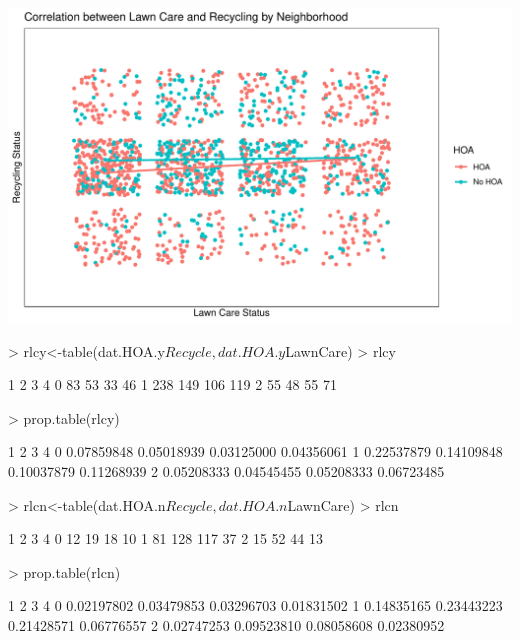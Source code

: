 \documentclass{article}
\begin{document}
\includegraphics{exam1-012}
\newline
\begin{Schunk}
\begin{Sinput}
> rlcy<-table(dat.HOA.y$Recycle,dat.HOA.y$LawnCare)
> rlcy
\end{Sinput}
\begin{Soutput}
      1   2   3   4
  0  83  53  33  46
  1 238 149 106 119
  2  55  48  55  71
\end{Soutput}
\begin{Sinput}
> prop.table(rlcy)
\end{Sinput}
\begin{Soutput}
             1          2          3          4
  0 0.07859848 0.05018939 0.03125000 0.04356061
  1 0.22537879 0.14109848 0.10037879 0.11268939
  2 0.05208333 0.04545455 0.05208333 0.06723485
\end{Soutput}
\begin{Sinput}
> rlcn<-table(dat.HOA.n$Recycle,dat.HOA.n$LawnCare)
> rlcn
\end{Sinput}
\begin{Soutput}
      1   2   3   4
  0  12  19  18  10
  1  81 128 117  37
  2  15  52  44  13
\end{Soutput}
\begin{Sinput}
> prop.table(rlcn)
\end{Sinput}
\begin{Soutput}
             1          2          3          4
  0 0.02197802 0.03479853 0.03296703 0.01831502
  1 0.14835165 0.23443223 0.21428571 0.06776557
  2 0.02747253 0.09523810 0.08058608 0.02380952
\end{Soutput}
\end{Schunk}
\end{document}
